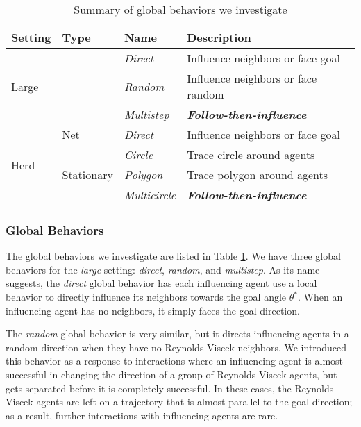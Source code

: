\begin{table}[]
\footnotesize
\centering
\caption{Summary of global behaviors we investigate}
\label{table:global}
\begin{tabular}{|l|l|l|l|}
\hline
\textbf{Setting}       & \textbf{Type}               & \textbf{Name}        & \textbf{Description}                    \\ \hline
\multirow{3}{*}{Large} & \multirow{3}{*}{\textbf{}}  & \textit{Direct}      & Influence neighbors or face goal        \\ \cline{3-4}
                       &                             & \textit{Random}      & Influence neighbors or face random      \\ \cline{3-4}
                       &                             & \textit{Multistep}   & \textit{\textbf{Follow-then-influence}} \\ \hline
\multirow{4}{*}{Herd}  & Net                         & \textit{Direct}      & Influence neighbors or face goal        \\ \cline{2-4}
                       & \multirow{3}{*}{Stationary} & \textit{Circle}      & Trace circle around agents              \\ \cline{3-4}
                       &                             & \textit{Polygon}     & Trace polygon around agents             \\ \cline{3-4}
                       &                             & \textit{Multicircle} & \textit{\textbf{Follow-then-influence}} \\ \hline
\end{tabular}
\end{table}


\subsubsection*{Global Behaviors}
The global behaviors we investigate are listed in Table \ref{table:global}.
We have three global behaviors for the \textit{large} setting: \textit{direct},
\textit{random}, and \textit{multistep}.
As its name suggests, the \textit{direct} global behavior has each influencing
agent use a local behavior to directly influence its neighbors towards the
goal angle $\theta^*$.
When an influencing agent has no neighbors, it simply faces the goal direction.

The \textit{random} global behavior is very similar, but it directs influencing
agents in a random direction when they have no Reynolds-Viscek neighbors.
We introduced this behavior as a response to interactions where an influencing
agent is almost successful in changing the direction of a group of Reynolds-Viscek
agents, but gets separated before it is completely successful.
In these cases, the Reynolds-Viscek agents are left on a trajectory that is almost
parallel to the goal direction; as a result, further interactions with
influencing agents are rare.

